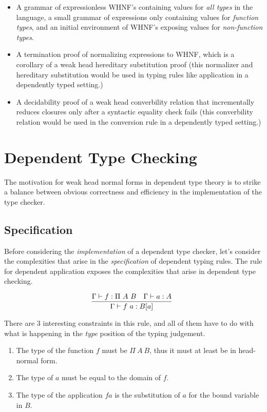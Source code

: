 \documentclass[preprint,authoryear]{sigplanconf}
\def\turnstyle{\vdash}
\begin{document}
\begin{itemize}
\item A grammar of expressionless WHNF's containing values for {\it all
  types} in the language, a small grammar of expressions only
  containing values for {\it function types}, and an initial environment of
  WHNF's exposing values for {\it non-function types}.
\item A termination proof of normalizing expressions to WHNF, which is
  a corollary of a weak head hereditary substitution proof (this
  normalizer and hereditary substitution would be used in typing rules
  like application in a dependently typed setting.)
\item A decidability proof of a weak head converbility relation that
  incrementally reduces closures only after a syntactic equality check
  fails (this converbility relation would be used in the conversion
  rule in a dependently typed setting.)
\end{itemize}


\section{Dependent Type Checking}
\label{sec:motivation}

The motivation for weak head normal forms in dependent type theory is
to strike a balance between obvious correctness and efficiency in the
implementation of the type checker. 

\subsection{Specification}

Before considering the {\it implementation} of a dependent type checker,
let's consider the complexities that arise in the
{\it specification} of dependent typing rules.
The rule for dependent application exposes the complexities
that arise in dependent type checking.

$$
\infer[]
  {\Gamma \turnstyle f~a : B[a]}
{
  \Gamma \turnstyle f : \Pi~A~B
  &
  \Gamma \turnstyle a : A
}
$$

There are 3 interesting
constraints in this rule, and all of them have to do with what is
happening in the {\it type} position of the typing judgement.

\begin{enumerate}
\item The type of the function $f$ must be $\Pi~A~B$, thus it must at
  least be in head-normal form.
\item The type of $a$ must be equal to the domain of $f$.
\item The type of the application $f a$ is the substitution of $a$ for
  the bound variable in $B$.
\end{enumerate}
\end{document}
